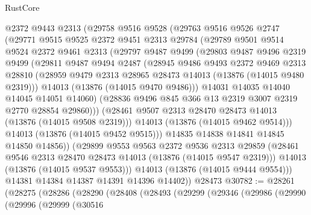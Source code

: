 \begin{lexlean}{RustCore}
\begin{coremodule}
          @2372
          @9443
          @2313
          (@29758
            @9516
            @9528
            (@29763
              @9516
              @9526
              @2747
              (@29771
                @9515
                @9525
                @2372
                @9451
                @2313
                @29784
                (@29789
                  @9501
                  @9514
                  @9524
                  @2372
                  @9461
                  @2313
                  (@29797
                    @9487
                    @9499
                    (@29803
                      @9487
                      @9496
                      @2319
                      @9499
                      (@29811
                        @9487
                        @9494
                        @2487
                        (@28945
                          @9486
                          @9493
                          @2372
                          @9469
                          @2313
                          @28810
                          (@28959 @9479 @2313 @28965 @28473 @14013 (@13876 (@14015 @9480 @2319)))
                          @14013
                          (@13876 (@14015 @9470 @9486)))
                        @14031
                        @14035
                        @14040
                        @14045
                        @14051
                        @14060)
                      (@28836 @9496 @845 @366 @13 @2319 @3007 @2319 @2770 @28854 @29860)))
                  (@28461 @9507 @2313 @28470 @28473 @14013 (@13876 (@14015 @9508 @2319)))
                  @14013
                  (@13876 (@14015 @9462 @9514)))
                @14013
                (@13876 (@14015 @9452 @9515)))
              @14835
              @14838
              @14841
              @14845
              @14850
              @14856))
          (@29899
            @9553
            @9563
            @2372
            @9536
            @2313
            @29859
            (@28461 @9546 @2313 @28470 @28473 @14013 (@13876 (@14015 @9547 @2319)))
            @14013
            (@13876 (@14015 @9537 @9553)))
          @14013
          (@13876 (@14015 @9444 @9554)))
        @14381
        @14384
        @14387
        @14391
        @14396
        @14402))
    @28473
@30782 := @28261
    (@28275
      (@28286
        (@28290
          (@28408
            (@28493
              (@29299
                (@29346
                  (@29986
                    (@29990
                      (@29996
                        (@29999
                          (@30516

\end{coremodule}
\end{lexlean}
